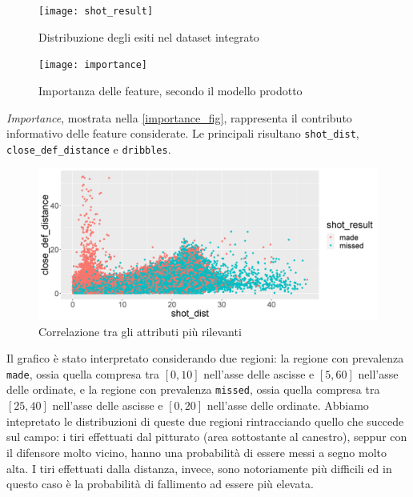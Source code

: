 \begin{figure}
\caption{Distribuzione degli esiti nel dataset integrato}
\label{dist_shot_result}
	\texttt{[image: shot\_result]}
\end{figure}

\par

\begin{figure}
\caption{Importanza delle feature, secondo il modello prodotto}
\label{importance_fig}
\fontsize{9pt}{1em}
	\texttt{[image: importance]}
\end{figure}

\par

\textit{Importance}, mostrata nella \autoref{importance_fig}, rappresenta il contributo informativo delle feature considerate. Le principali risultano \texttt{shot\_dist}, \texttt{close\_def\_distance} e \texttt{dribbles}.

\begin{figure}
\caption{Correlazione tra gli attributi più rilevanti}
\label{plot_shot_dist_def}
\includegraphics[width=\linewidth]{plot_shot_dist_def.png}
\end{figure}

Il grafico è stato interpretato considerando due regioni: la regione con prevalenza \texttt{made}, ossia quella compresa tra $[0, 10]$ nell'asse delle ascisse e $[5, 60] $ nell'asse delle ordinate, e la regione con prevalenza \texttt{missed}, ossia quella compresa tra $[25, 40]$ nell'asse delle ascisse e $[0, 20] $ nell'asse delle ordinate.
Abbiamo intepretato le distribuzioni di queste due regioni rintracciando quello che succede sul campo: i tiri effettuati dal pitturato (area sottostante al canestro), seppur con il difensore molto vicino, hanno una probabilità di essere messi a segno molto alta. I tiri effettuati dalla distanza, invece, sono notoriamente più difficili ed in questo caso è la probabilità di fallimento ad essere più elevata.


